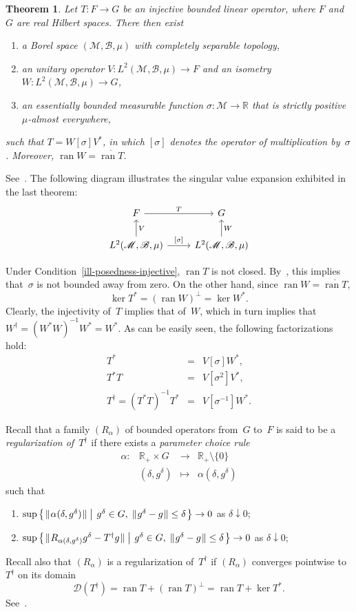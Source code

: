 \documentclass[a4paper]{article}
\newtheorem{theorem}{Theorem}
\def\Re{\mathds{R}}
\def\B{\mathscr{B}}
\def\D{\mathscr{D}}
\def\M{\mathscr{M}}
\def\ran#1{\mathop{\mathrm{ran}}#1}
\def\ker#1{\mathop{\mathrm{ker}}#1}
\def\vphan{\vphantom{\bigl|}}
\def\setc#1#2{
    \left\{
    \mskip 2mu #1 \mskip 2mu
    \left| \vphan\vphantom{#1#2} \right.
    \mskip 2mu #2 \mskip 2mu
    \right\}
    }
\def\norm#1{\| \mskip 1mu #1 \mskip 1mu \|}
\def\operator#1#2#3#4#5{
        \begin{array}{lcll}
        \displaystyle #1 \colon & \displaystyle #2 & \longrightarrow & \displaystyle #3 \\[.2ex]
                     & \displaystyle #4 & \longmapsto     & \displaystyle #5
        \end{array}
        }
\begin{document}
\begin{theorem}\sf
\label{sve}
Let $T\colon F\to G$ be an injective bounded linear operator, where $F$ and $G$
are real Hilbert spaces. There then exist
\begin{enumerate}
\item
a Borel space $(\M,\B,\mu)$ with completely separable topology,
\item
an unitary operator $V\colon L^2(\M,\B,\mu)\to F$ and
an isometry $W\colon L^2(\M,\B,\mu)\to G$,
\item
an essentially bounded measurable function $\sigma\colon\M\to\Re$
that is strictly positive $\mu$-almost everywhere,
\end{enumerate}
such that $T=W[\sigma]V^*$, in which $[\sigma]$ denotes the operator of
multiplication by~$\sigma$. Moreover, $\ran{W}=\overline{\ran{T}}$. 
\end{theorem}
See~\cite[Theorem 3]{crane2020singular}.
The following diagram illustrates the singular value expansion
exhibited in the last theorem:
$$
\begin{tikzcd}
F \arrow{r}{T}
& G \\
L^2(\M,\B,\mu)\arrow[swap]{u}{V}
\arrow{r}{[\sigma]}
& L^2(\M,\B,\mu)\arrow[swap]{u}{W}
\end{tikzcd}
$$

Under Condition~\eqref{ill-posedness-injective}, $\ran{T}$
is not closed. By~\cite[Theorem 4]{crane2020singular}, this
implies that~$\sigma$ is not bounded away from zero.
On the other hand, since $\ran{W}=\overline{\ran{T}}$,
$$
\ker{T^*}=(\ran{W})^\perp=\ker{W^*}.
$$
Clearly, the injectivity of~$T$ implies that of~$W$,
which in turn implies that $W^\dagger=(W^*W)^{-1}W^*=W^*$.
As can be easily seen, the following factorizations hold:
\begin{eqnarray*}
T^*&=&V[\sigma]W^*,\\
T^*T&=&V[\sigma^2]V^*,\\
T^\dagger=(T^*T)^{-1}T^*&=&V[\sigma^{-1}]W^*.
\end{eqnarray*}

Recall that a family $(R_\alpha)$ of bounded operators from~$G$
to~$F$ is said to be a {\sl regularization of~$T^\dagger$}
if there exists a {\sl parameter choice rule}
$$
\operator{\alpha}{\Re_+\times G}{\Re_+\setminus\{0\}}
{(\delta,g^\delta)}{\alpha(\delta,g^\delta)}
$$
such that
\begin{enumerate}
\item[(1)]
$\sup\setc
{\norm{\alpha(\delta,g^\delta)}}
{g^\delta\in G,\;\norm{g^\delta-g}\leq\delta}
\to 0$ as $\delta\downarrow 0$;
\item[(2)]
$\sup\setc
{\norm{R_{\alpha(\delta,g^\delta)}g^\delta-T^\dagger g}}
{g^\delta\in G,\;\norm{g^\delta-g}\leq\delta}
\to 0$ as $\delta\downarrow 0$;
\end{enumerate}
Recall also that $(R_\alpha)$ is a regularization of~$T^\dagger$
if $(R_\alpha)$ converges pointwise to~$T^\dagger$ on its domain
$$
\D(T^\dagger)=\ran{T}+(\ran{T})^\perp=\ran{T}+\ker{T^*}.
$$
See~\cite[Proposition 3.4]{engl1996regularization}.
\end{document}
